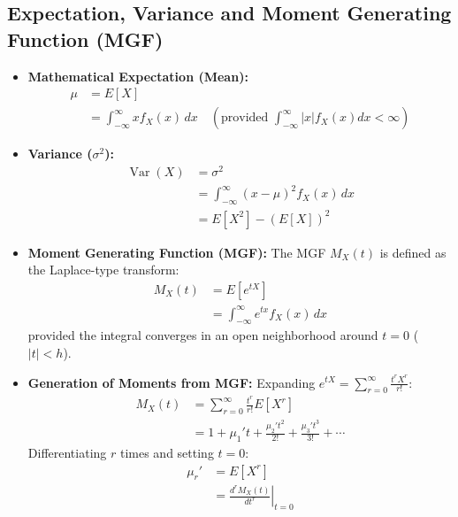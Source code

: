 \documentclass[12pt,a4paper]{article}
\begin{document}
\subsection{Expectation, Variance and Moment Generating Function (MGF)}
\begin{itemize}[leftmargin=*, itemsep=3pt]
  \item \textbf{Mathematical Expectation (Mean):}
  \begin{equation}
    \begin{aligned}
      \mu &= E[X] \\[3pt]
      &= \int_{-\infty}^\infty x f_X(x) \, dx \quad (\text{provided } \int_{-\infty}^\infty |x| f_X(x) dx < \infty)
    \end{aligned}
  \end{equation}
  \item \textbf{Variance ($\sigma^2$):}
  \begin{equation}
    \begin{aligned}
      \operatorname{Var}(X) &= \sigma^2 \\[3pt]
      &= \int_{-\infty}^\infty (x - \mu)^2 f_X(x) \, dx \\[3pt]
      &= E[X^2] - (E[X])^2
    \end{aligned}
  \end{equation}
  \item \textbf{Moment Generating Function (MGF):} The MGF $M_X(t)$ is defined as the Laplace-type transform:
  \begin{equation}
    \begin{aligned}
      M_X(t) &= E\left[e^{tX}\right] \\[3pt]
      &= \int_{-\infty}^\infty e^{tx} f_X(x) \, dx
    \end{aligned}
  \end{equation}
  provided the integral converges in an open neighborhood around $t = 0$ ($|t| < h$).
  \item \textbf{Generation of Moments from MGF:} Expanding $e^{tX} = \sum_{r=0}^\infty \frac{t^r X^r}{r!}$:
  \begin{equation}
    \begin{aligned}
      M_X(t) &= \sum_{r=0}^\infty \frac{t^r}{r!} E[X^r] \\[3pt]
      &= 1 + \mu_1' t + \frac{\mu_2' t^2}{2!} + \frac{\mu_3' t^3}{3!} + \cdots
    \end{aligned}
  \end{equation}
  Differentiating $r$ times and setting $t = 0$:
  \begin{equation}
    \begin{aligned}
      \mu_r' &= E[X^r] \\[3pt]
      &= \left.\frac{d^r M_X(t)}{dt^r}\right|_{t=0}
    \end{aligned}
  \end{equation}
\end{itemize}
\end{document}
